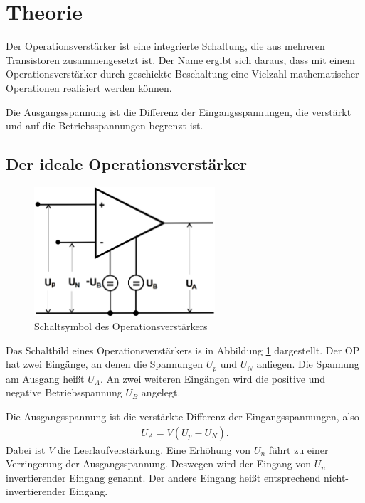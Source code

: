 \section{Theorie}

Der Operationsverstärker ist eine integrierte Schaltung, die aus mehreren Transistoren zusammengesetzt ist.
Der Name ergibt sich daraus, dass mit einem Operationsverstärker durch geschickte Beschaltung eine Vielzahl mathematischer Operationen realisiert werden können.

Die Ausgangsspannung ist die Differenz der Eingangsspannungen, die verstärkt und auf die Betriebsspannungen begrenzt ist.

\subsection{Der ideale Operationsverstärker}

\begin{figure}
	\centering
	\includegraphics[width=0.6\textwidth]{img/op.png}
	\caption{Schaltsymbol des Operationsverstärkers \cite{v51}}
	\label{fig:op}
\end{figure}

Das Schaltbild eines Operationsverstärkers is in Abbildung \ref{fig:op} dargestellt.
Der OP hat zwei Eingänge, an denen die Spannungen $U_p$ und $U_N$ anliegen.
Die Spannung am Ausgang heißt $U_A$.
An zwei weiteren Eingängen wird die positive und negative Betriebsspannung $U_B$ angelegt.

Die Ausgangsspannung ist die verstärkte Differenz der Eingangsspannungen, also
\begin{align}
	U_A = V \left(U_p - U_N\right).
\end{align}
Dabei ist $V$ die Leerlaufverstärkung.
Eine Erhöhung von $U_n$ führt zu einer Verringerung der Ausgangsspannung.
Deswegen wird der Eingang von $U_n$ invertierender Eingang genannt.
Der andere Eingang heißt entsprechend nicht-invertierender Eingang.

